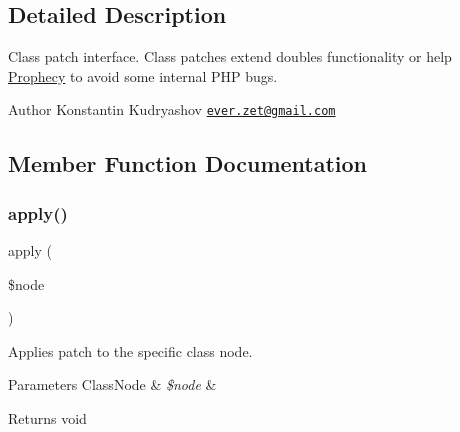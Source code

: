 \subsection{Detailed Description}
Class patch interface. Class patches extend doubles functionality or help \mbox{\hyperlink{namespace_prophecy_1_1_prophecy}{Prophecy}} to avoid some internal P\+HP bugs.

\begin{DoxyAuthor}{Author}
Konstantin Kudryashov \href{mailto:ever.zet@gmail.com}{\tt ever.\+zet@gmail.\+com} 
\end{DoxyAuthor}


\subsection{Member Function Documentation}
\mbox{\label{interface_prophecy_1_1_doubler_1_1_class_patch_1_1_class_patch_interface_a62fdb697928f35fc782d6889b8fe9b8b}} 
\subsubsection{\texorpdfstring{apply()}{apply()}}
{\footnotesize\ttfamily apply (\begin{DoxyParamCaption}\item[{\mbox{\hyperlink{class_prophecy_1_1_doubler_1_1_generator_1_1_node_1_1_class_node}{Class\+Node}}}]{\$node }\end{DoxyParamCaption})}

Applies patch to the specific class node.


\begin{DoxyParams}[1]{Parameters}
Class\+Node & {\em \$node} & \\
\hline
\end{DoxyParams}
\begin{DoxyReturn}{Returns}
void 
\end{DoxyReturn}


